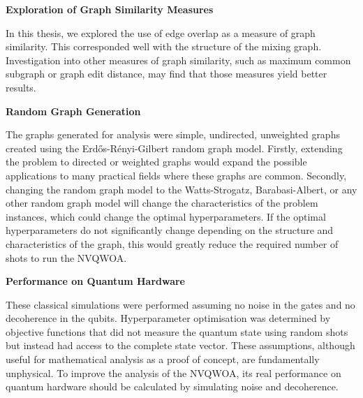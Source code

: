 \textbf{Exploration of Graph Similarity Measures}

In this thesis, we explored the use of edge overlap as a measure of graph similarity. This corresponded well with the structure of the mixing graph. Investigation into other measures of graph similarity, such as maximum common subgraph or graph edit distance, may find that those measures yield better results.

\textbf{Random Graph Generation}

The graphs generated for analysis were simple, undirected, unweighted graphs created using the Erdős-Rényi-Gilbert random graph model\cite{erdos_renyi,gilbert}. Firstly, extending the problem to directed or weighted graphs would expand the possible applications to many practical fields where these graphs are common.
Secondly, changing the random graph model to the Watts-Strogatz, Barabasi-Albert, or any other random graph model will change the characteristics of the problem instances, which could change the optimal hyperparameters. If the optimal hyperparameters do not significantly change depending on the structure and characteristics of the graph, this would greatly reduce the required number of shots to run the NVQWOA.

\textbf{Performance on Quantum Hardware}

These classical simulations were performed assuming no noise in the gates and no decoherence in the qubits. Hyperparameter optimisation was determined by objective functions that did not measure the quantum state using random shots but instead had access to the complete state vector. These assumptions, although useful for mathematical analysis as a proof of concept, are fundamentally unphysical. To improve the analysis of the NVQWOA, its real performance on quantum hardware should be calculated by simulating noise and decoherence.
